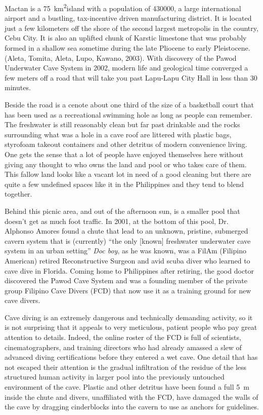 \documentclass[spanish]{ijsra}
\begin{document}
Mactan is a \SI{75}{\kilo\metre\squared}island with a population of \num{430000}, a large international airport and a bustling, tax-incentive driven manufacturing district. 
It is located just a few kilometers off the shore of the second largest metropolis in the country, Cebu City. It is also an uplifted chunk of Karstic limestone that was probably formed in a shallow sea sometime during the late Pliocene to early Pleistocene. (Aleta, Tomita, Aleta, Lupo, Kawano, 2003). With discovery of the Pawod Underwater Cave System in 2002, modern life and geological time converged a few meters off a road that will take you past Lapu-Lapu City Hall in less than 30 minutes.

Beside the road is a cenote about one third of the size of a basketball court that has been used as a recreational swimming hole as long as people can remember. The freshwater is still reasonably clean but far past drinkable and the rocks surrounding what was a hole in a cave roof are littered with plastic bags, styrofoam takeout containers and other detritus of modern convenience living. One gets the sense that a lot of people have enjoyed themselves here without giving any thought to who owns the land and pool or who takes care of them. This fallow land looks like a vacant lot in need of a good cleaning but there are quite a few undefined spaces like it in the Philippines and they tend to blend together.

Behind this picnic area, and out of the afternoon sun, is a smaller pool that doesn’t get as much foot traffic.  In 2001, at the bottom of this pool, Dr. Alphonso Amores found a chute that lead to an unknown, pristine, submerged cavern system that is (currently) “the only [known] freshwater underwater cave system in an urban setting” %
\textit{Doc boy}, as he was known, was a FilAm (Filipino American) retired Reconstructive Surgeon and avid scuba diver who learned to cave dive in Florida. Coming home to Philippines after retiring, the good doctor discovered the Pawod Cave System and was a founding member of the private group Filipino Cave Divers (FCD) that now use it as a training ground for new cave divers. 

Cave diving is an extremely dangerous and technically demanding activity, so it is not surprising that it appeals to very meticulous, patient people who pay great attention to details. Indeed, the online roster of the FCD is full of scientists, cinematographers, and training directors who had already amassed a slew of advanced diving certifications before they entered a wet cave. One detail that has not escaped their attention is the gradual infiltration of the residue of the less structured human activity in larger pool into the previously untouched environment of the cave. Plastic and other detritus have been found a full \SI{5}{\metre} inside the chute and divers, unaffiliated with the FCD, have damaged the walls of the cave by dragging cinderblocks into the cavern to use as anchors for guidelines. 
\end{document}
